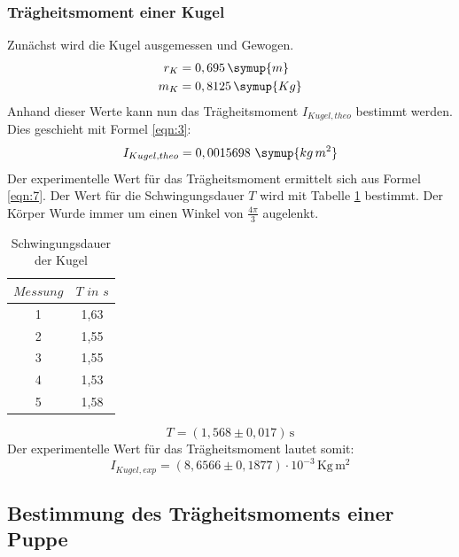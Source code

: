 \documentclass[
  bibliography=totoc,     %
  captions=tableheading,  %
  titlepage=firstiscover, %
]{scrartcl}
\begin{document}
\subsubsection{Trägheitsmoment einer Kugel}

Zunächst wird die Kugel ausgemessen und Gewogen.
\begin{align}
  r_K &= 0,695 \, \symup{m} \\
  m_K &= 0,8125 \, \symup{Kg}
\end{align}
Anhand dieser Werte kann nun das Trägheitsmoment $I_{Kugel, theo}$ bestimmt werden.
Dies geschieht mit Formel \ref{eqn:3}:
 \begin{equation}
   I_{Kugel,theo}= 0,0015698 \, \, \symup{kg \, m^2}
 \end{equation}
 Der experimentelle Wert für das Trägheitsmoment ermittelt sich aus Formel \ref{eqn:7}.
 Der Wert für die Schwingungsdauer $T$ wird mit Tabelle \ref{tab:schw} bestimmt.
Der Körper Wurde immer um einen Winkel von $ \frac{4\pi}{3}$ augelenkt.

 \begin{table}
   \centering
   \caption{Schwingungsdauer der Kugel}
   \label{tab:schw}
\begin{tabular}{cc}
  \toprule
  $Messung$ & $T \, \, in \, \, s$ \\
  \midrule
  1 & 1,63 \\
  2 & 1,55 \\
  3 & 1,55 \\
  4 & 1,53 \\
  5 & 1,58 \\
  \bottomrule
\end{tabular}
\end{table}
\begin{equation}
  T= (1{,}568 \pm 0{,}017) \, \mathrm{s}
\end{equation}
Der experimentelle Wert für das Trägheitsmoment lautet somit:
\begin{equation}
  I_{Kugel,exp}= (8{,}6566 \pm 0{,}1877) \cdot 10^{-3} \, \mathrm{Kg \, m^2} %
\end{equation}

\subsection{Bestimmung des Trägheitsmoments einer Puppe}
\end{document}
